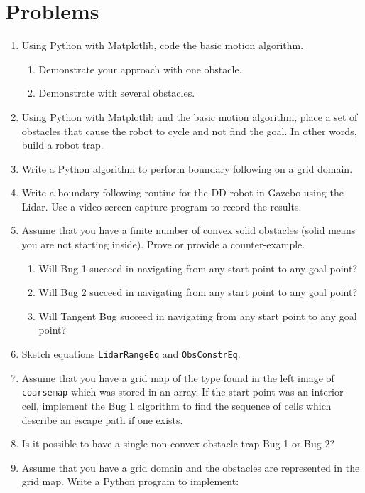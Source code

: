 \hypertarget{problems}{%
\section{Problems}\label{problems}}

\begin{enumerate}
\tightlist
\item
  Using Python with Matplotlib, code the basic motion algorithm.

  \begin{enumerate}
  \def\labelenumii{\alph{enumii}.}
  \tightlist
  \item
    Demonstrate your approach with one obstacle.
  \item
    Demonstrate with several obstacles.
  \end{enumerate}
\item
  Using Python with Matplotlib and the basic motion algorithm, place a
  set of obstacles that cause the robot to cycle and not find the goal.
  In other words, build a robot trap.
\item
  Write a Python algorithm to perform boundary following on a grid
  domain.
\item
  Write a boundary following routine for the DD robot in Gazebo using
  the Lidar. Use a video screen capture program to record the results.
\item
  Assume that you have a finite number of convex solid obstacles (solid
  means you are not starting inside). Prove or provide a
  counter-example.

  \begin{enumerate}
  \def\labelenumii{\alph{enumii}.}
  \tightlist
  \item
    Will Bug 1 succeed in navigating from any start point to any goal
    point?
  \item
    Will Bug 2 succeed in navigating from any start point to any goal
    point?
  \item
    Will Tangent Bug succeed in navigating from any start point to any
    goal point?
  \end{enumerate}
\item
  Sketch equations \texttt{LidarRangeEq} and \texttt{ObsConstrEq}.
\item
  Assume that you have a grid map of the type found in the left image of
  \texttt{coarsemap} which was stored in an array. If the start point
  was an interior cell, implement the Bug 1 algorithm to find the
  sequence of cells which describe an escape path if one exists.
\item
  Is it possible to have a single non-convex obstacle trap Bug 1 or Bug
  2?
\item
  Assume that you have a grid domain and the obstacles are represented
  in the grid map. Write a Python program to implement:


\end{enumerate}

